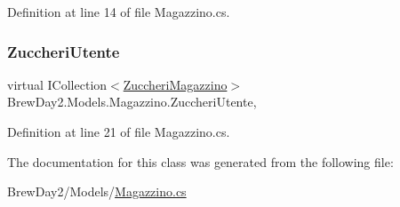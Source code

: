 Definition at line 14 of file Magazzino.\+cs.

\mbox{\label{class_brew_day2_1_1_models_1_1_magazzino_a1ec01b1101ed7d84c35da0005ce6a1ca}} 
\subsubsection{\texorpdfstring{Zuccheri\+Utente}{ZuccheriUtente}}
{\footnotesize\ttfamily virtual I\+Collection$<$\mbox{\hyperlink{class_brew_day2_1_1_models_1_1_zuccheri_magazzino}{Zuccheri\+Magazzino}}$>$ Brew\+Day2.\+Models.\+Magazzino.\+Zuccheri\+Utente\hspace{0.3cm}{\ttfamily [get]}, {\ttfamily [set]}}



Definition at line 21 of file Magazzino.\+cs.



The documentation for this class was generated from the following file\+:\begin{DoxyCompactItemize}
\item 
Brew\+Day2/\+Models/\mbox{\hyperlink{_magazzino_8cs}{Magazzino.\+cs}}\end{DoxyCompactItemize}
